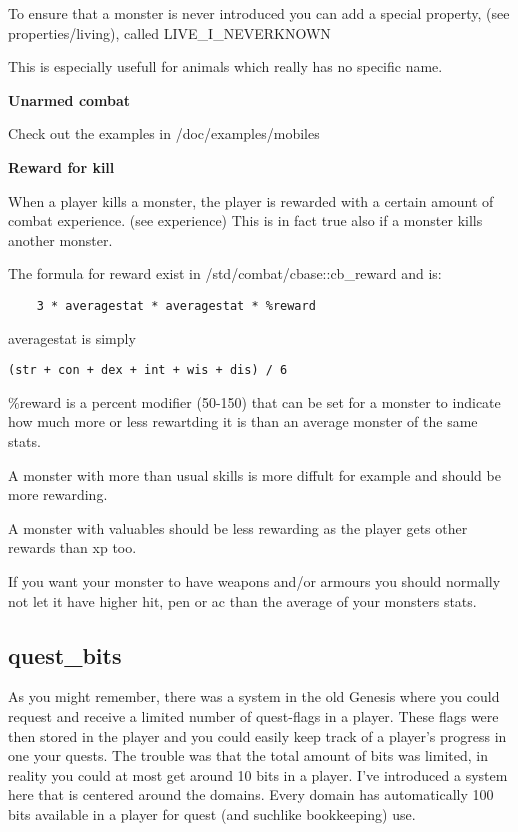 To ensure that a monster is never introduced you can add a special property,
(see properties/living), called LIVE\_I\_NEVERKNOWN

This is especially usefull for animals which really has no specific name.

{\bf Unarmed combat}

Check out the examples in /doc/examples/mobiles

{\bf Reward for kill}

When a player kills a monster, the player is rewarded with a certain amount
of combat experience. (see experience) This is in fact true also if a monster
kills another monster.

The formula for reward exist in /std/combat/cbase::cb\_reward and is:
\begin{verbatim}
    3 * averagestat * averagestat * %reward
\end{verbatim}
averagestat is simply
\begin{verbatim}
(str + con + dex + int + wis + dis) / 6
\end{verbatim}
\%reward is a percent modifier (50-150) that can be set for a monster
to indicate how much more or less rewartding it is than an average monster
of the same stats.

A monster with more than usual skills is more diffult for example and should
be more rewarding.

A monster with valuables should be less rewarding as the player gets other
rewards than xp too.

If you want your monster to have weapons and/or armours you should normally not
let it have higher hit, pen or ac than the average of your monsters stats.
    

\subsection{quest\_bits}

As you might remember, there was a system in the old Genesis where you
could request and receive a limited number of quest-flags in a player.
These flags were then stored in the player and you could easily keep
track of a player's progress in one your quests. The trouble was that
the total amount of bits was limited, in reality you could at most
get around 10 bits in a player. I've introduced a system here that 
is centered around the domains. Every domain has automatically 100
bits available in a player for quest (and suchlike bookkeeping) use.

